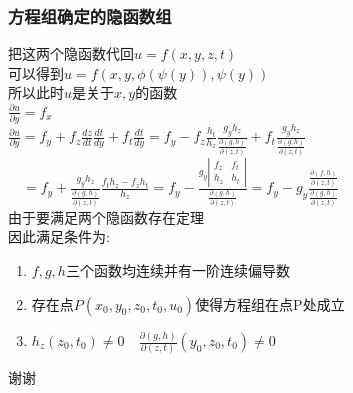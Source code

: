 \documentclass[xetex]{beamer}
\begin{document}
\begin{frame}
\frametitle{方程组确定的隐函数组}
	把这两个隐函数代回$u=f(x,y,z,t)$\\
	可以得到$u=f(x,y,\phi(\psi(y)),\psi(y))$\\ \pause
	所以此时$u$是关于$x,y$的函数\\
	$\frac{\partial u}{\partial y}=f_x$\\
	$\frac{\partial u}{\partial y}=f_y+f_z\frac{dz}{dt}\frac{dt}{dy}+f_t\frac{dt}{dy}=f_y-f_z\frac{h_t}{h_z}\frac{g_y h_z}{\frac{\partial (g,h)}{\partial (z,t)}}+f_t\frac{g_y h_z}{\frac{\partial (g,h)}{\partial (z,t)}}$\\ \pause
	$\quad = f_y+\frac{g_y h_z}{\frac{\partial (g,h)}{\partial (z,t)}}\frac{f_t h_z-f_z h_t}{h_z}=f_y-\frac{g_y
			\left|
		\begin{matrix}
		f_z & f_t\\
		h_z & h_t
		\end{matrix}
		\right|
	}{\frac{\partial (g,h)}{\partial (z,t)}}=f_y-g_y\frac{\frac{\partial (f,h)}{\partial (z,t)}}{\frac{\partial (g,h)}{\partial (z,t)}}$\\ \pause
	由于要满足两个隐函数存在定理\\
	因此满足条件为:
	\begin{enumerate}
		\item
			$f,g,h$三个函数均连续并有一阶连续偏导数
		\item
			存在点$P(x_0,y_0,z_0,t_0,u_0)$\quad 使得方程组在点P处成立\\
		\item
			$h_z(z_0,t_0)\not =0\quad \frac{\partial (g,h)}{\partial (z,t)}(y_0,z_0,t_0)\not =0$\\
			
	\end{enumerate}
\end{frame}

\begin{frame}[standout]
	谢谢
\end{frame}
\end{document}

